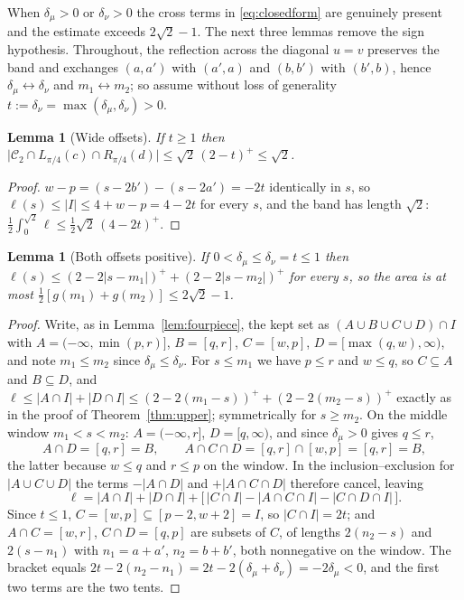 \documentclass[11pt]{article}
\newtheorem{lemma}[theorem]{Lemma}
\theoremstyle{definition}
\newcommand{\dmu}{\delta_\mu}
\newcommand{\dnu}{\delta_\nu}
\begin{document}
When $\dmu>0$ or $\dnu>0$ the cross terms in \eqref{eq:closedform} are genuinely present
and the estimate exceeds $2\sqrt2-1$. The next three lemmas remove the sign hypothesis.
Throughout, the reflection across the diagonal $u=v$ preserves the band and exchanges
$(a,a')$ with $(a',a)$ and $(b,b')$ with $(b',b)$, hence $\dmu\leftrightarrow\dnu$ and
$m_1\leftrightarrow m_2$; so assume without loss of generality
$t:=\dnu=\max(\dmu,\dnu)>0$.

\begin{lemma}[Wide offsets]\label{lem:wide}
If $t\ge1$ then
$\bigl|\mathcal C_2\cap L_{\pi/4}(c)\cap R_{\pi/4}(d)\bigr|\le\sqrt2\,(2-t)^+\le\sqrt2$.
\end{lemma}

\begin{proof}
$w-p=(s-2b')-(s-2a')=-2t$ identically in $s$, so
$\ell(s)\le|I|\le4+w-p=4-2t$ for every $s$, and the band has length $\sqrt2$:
$\tfrac12\int_0^{\sqrt2}\ell\le\tfrac12\sqrt2\,(4-2t)^+$.
\end{proof}

\begin{lemma}[Both offsets positive]\label{lem:bothpos}
If $0<\dmu\le\dnu=t\le1$ then $\ell(s)\le(2-2|s-m_1|)^++(2-2|s-m_2|)^+$ for every $s$, so
the area is at most $\tfrac12[g(m_1)+g(m_2)]\le2\sqrt2-1$.
\end{lemma}

\begin{proof}
Write, as in Lemma~\ref{lem:fourpiece}, the kept set as $(A\cup B\cup C\cup D)\cap I$
with $A=(-\infty,\min(p,r)]$, $B=[q,r]$, $C=[w,p]$, $D=[\max(q,w),\infty)$, and note
$m_1\le m_2$ since $\dmu\le\dnu$. For $s\le m_1$ we have $p\le r$ and $w\le q$, so
$C\subseteq A$ and $B\subseteq D$, and
$\ell\le|A\cap I|+|D\cap I|\le(2-2(m_1-s))^++(2-2(m_2-s))^+$ exactly as in the proof of
Theorem~\ref{thm:upper}; symmetrically for $s\ge m_2$. On the middle window $m_1<s<m_2$:
$A=(-\infty,r]$, $D=[q,\infty)$, and since $\dmu>0$ gives $q\le r$,
\[
  A\cap D=[q,r]=B,\qquad A\cap C\cap D=[q,r]\cap[w,p]=[q,r]=B,
\]
the latter because $w\le q$ and $r\le p$ on the window. In the inclusion--exclusion for
$|A\cup C\cup D|$ the terms $-|A\cap D|$ and $+|A\cap C\cap D|$ therefore cancel, leaving
\[
  \ell=|A\cap I|+|D\cap I|+\bigl[\,|C\cap I|-|A\cap C\cap I|-|C\cap D\cap I|\,\bigr].
\]
Since $t\le1$, $C=[w,p]\subseteq[p-2,w+2]=I$, so $|C\cap I|=2t$; and
$A\cap C=[w,r]$, $C\cap D=[q,p]$ are subsets of $C$, of lengths $2(n_2-s)$ and $2(s-n_1)$
with $n_1=a+a'$, $n_2=b+b'$, both nonnegative on the window. The bracket equals
$2t-2(n_2-n_1)=2t-2(\dmu+\dnu)=-2\dmu<0$, and the first two terms are the two tents.
\end{proof}
\end{document}
